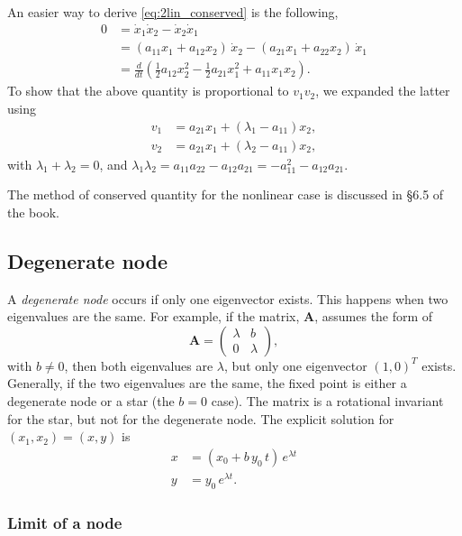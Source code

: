 \documentclass{book}
\begin{document}
An easier way to derive \eqref{eq:2lin_conserved} is the following,
$$
\begin{aligned}
0 &= \dot x_1 \dot x_2 - \dot x_2 \dot x_1 \\
  &= (a_{11} x_1 + a_{12} x_2) \, \dot x_2
   - (a_{21} x_1 + a_{22} x_2) \, \dot x_1 \\
  &= \frac{d}{dt} \left(
   \frac{1}{2} a_{12} x_2^2
   -\frac{1}{2} a_{21} x_1^2
   + a_{11} x_1 x_2
 \right).
\end{aligned}
$$
To show that the above quantity is proportional to $v_1 v_2$,
we expanded the latter using
$$
\begin{aligned}
  v_1 &= a_{21} x_1 + (\lambda_1 - a_{11}) x_2, \\
  v_2 &= a_{21} x_1 + (\lambda_2 - a_{11}) x_2,
\end{aligned}
$$
with $\lambda_1 + \lambda_2 = 0$, and
$\lambda_1 \lambda_2 = a_{11} a_{22} - a_{12} a_{21} = -a_{11}^2 - a_{12} a_{21}$.

The method of conserved quantity for the nonlinear case
is discussed in \S 6.5 of the book.




\subsection{Degenerate node}


A \emph{degenerate node} occurs if only one eigenvector exists.
This happens when two eigenvalues are the same.
For example, if the matrix, $\mathbf A$, assumes the form of
$$
\mathbf A =
\left(
  \begin{array}{cc}
    \lambda & b \\
    0 & \lambda
  \end{array}
\right),
$$
with $b \ne 0$,
then both eigenvalues are $\lambda$, but only one eigenvector $(1, 0)^T$ exists.
Generally, if the two eigenvalues are the same,
the fixed point is either a degenerate node or a star (the $b = 0$ case).
The matrix is a rotational invariant for the star,
but not for the degenerate node.
The explicit solution for $(x_1, x_2) = (x, y)$ is
\begin{equation}
\begin{aligned}
  x &= (x_0 + b \, y_0 \, t) \, e^{\lambda t} \\
  y &= y_0 \, e^{\lambda t}.
\end{aligned}
\label{eq:degenode}
\end{equation}


\subsubsection{Limit of a node}
\end{document}
